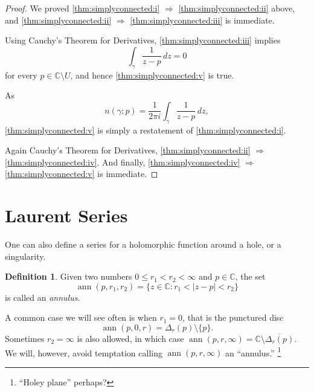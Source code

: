 \documentclass[12pt,openany]{book}
\newcommand{\ann}{\operatorname{ann}}
\newcommand{\sabs}[1]{\lvert {#1} \rvert}
\newcommand{\C}{{\mathbb{C}}}
\newcommand{\myindex}[1]{#1\index{#1}}
\theoremstyle{plain}
\theoremstyle{remark}
\theoremstyle{definition}
\newtheorem{defn}[thm]{Definition}
\theoremstyle{exercise}
\theoremstyle{example}
\begin{document}
\begin{proof}
We proved
\ref{thm:simplyconnected:i} $\Rightarrow$
\ref{thm:simplyconnected:ii} above,
and
\ref{thm:simplyconnected:ii} $\Rightarrow$
\ref{thm:simplyconnected:iii} is immediate.

Using Cauchy's Theorem for Derivatives,
\ref{thm:simplyconnected:iii} implies
\begin{equation*}
\int_\gamma \frac{1}{z-p} \, dz = 0 
\end{equation*}
for every $p \in \C \setminus U$,
and hence 
\ref{thm:simplyconnected:v} is true.

As 
\begin{equation*}
n(\gamma;p) = 
\frac{1}{2\pi i}
\int_\gamma \frac{1}{z-p} \, dz ,
\end{equation*}
\ref{thm:simplyconnected:v} is simply a restatement of
\ref{thm:simplyconnected:i}.

Again Cauchy's Theorem for Derivatives,
\ref{thm:simplyconnected:ii} $\Rightarrow$
\ref{thm:simplyconnected:iv}.
And finally, \ref{thm:simplyconnected:iv} $\Rightarrow$
\ref{thm:simplyconnected:v} is immediate.
\end{proof}


\section{Laurent Series}

One can also define a series for a holomorphic function around a hole, or a singularity.

\begin{defn}
Given two numbers $0 \leq r_1 < r_2 < \infty$ and $p \in \C$, the set
\begin{equation*}
\ann(p,r_1,r_2) = \{ z \in \C : r_1 < \sabs{z - p} < r_2 \}
\end{equation*}
is called an \emph{\myindex{annulus}}.
\end{defn}

A common case we will see often is when $r_1 = 0$, that is
the punctured disc
\begin{equation*}
\ann(p,0,r) = \Delta_r(p) \setminus \{ p \} .
\end{equation*}
Sometimes $r_2 = \infty$ is also allowed, in which case
$\ann(p,r,\infty) = \C \setminus \overline{\Delta_{r}(p)}$.  We will,
however, avoid temptation calling $\ann(p,r,\infty)$ an ``annulus.''%
\footnote{``Holey plane'' perhaps?}
\end{document}
